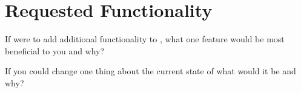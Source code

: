 
\section{Requested Functionality}

\md

\begin{question}
If \tc{} were to add additional functionality to \cry{}, what
one feature would be most beneficial to you and why?
\end{question}

\begin{question}
If you could change one thing about the current state of
\cry{} what would it be and why?
\end{question}
